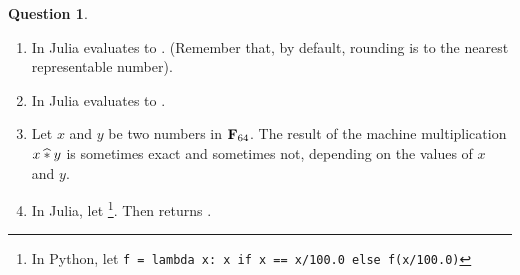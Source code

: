 \documentclass[11pt]{article}
\theoremstyle{definition}
\newtheorem{question}{Question}
\theoremstyle{remark}
\theoremstyle{plain}%
\begin{document}
\begin{question}
\begin{enumerate}
        \item
             In Julia  evaluates to .
             (Remember that, by default, rounding is to the nearest representable number).

        \item
             In Julia  evaluates to .

        \item
            Let $x$ and $y$ be two numbers in $\mathbf F_{64}$.
            The result of the machine multiplication $x \mathbin{\widehat *} y$ is sometimes exact and sometimes not,
            depending on the values of $x$ and $y$.

        \item
            In Julia, let 
            \footnote{%
                In Python, let \texttt{f = lambda x: x if x == x/100.0 else f(x/100.0)}
            }.
            Then  returns .



    \end{enumerate}
\end{question}
\end{document}
